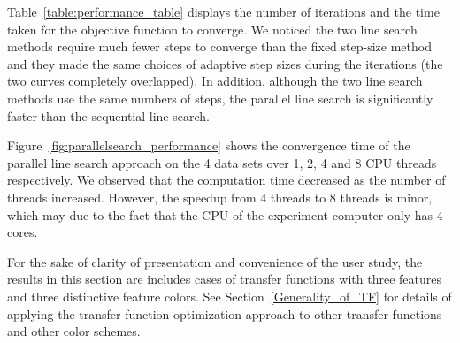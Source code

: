 Table~\ref{table:performance_table} displays the number of iterations and the time taken for the objective function to converge.
We noticed the two line search methods require much fewer steps to converge than the fixed step-size method and they made the same choices of adaptive step sizes during the iterations (the two curves completely overlapped).
In addition, although the two line search methods use the same numbers of steps, the parallel line search is significantly faster than the sequential line search.

Figure~\ref{fig:parallelsearch_performance} shows the convergence time of the parallel line search approach on the 4 data sets over 1, 2, 4 and 8 CPU threads respectively.
We observed that the computation time decreased as the number of threads increased. However, the speedup from 4 threads to 8 threads is minor, which may due to the fact that the CPU of the experiment computer only has 4 cores.

For the sake of clarity of presentation and convenience of the user study, the results in this section are includes cases of transfer functions with three features and three distinctive feature colors. See Section~\ref{Generality_of_TF} for details of applying the transfer function optimization approach to other transfer functions and other color schemes.


